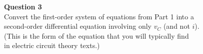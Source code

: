\documentclass[preview]{standalone}
\begin{document}
\begin{center}
\raggedright
                    \textbf{Question 3}\\
                    Convert the first-order system of equations from Part 1 into a \\
                    second-order differential equation involving only \( v_C \) (and not \( i \)). \\
                    (This is the form of the equation that you will typically find \\
                    in electric circuit theory texts.)
\end{center}
\end{document}
